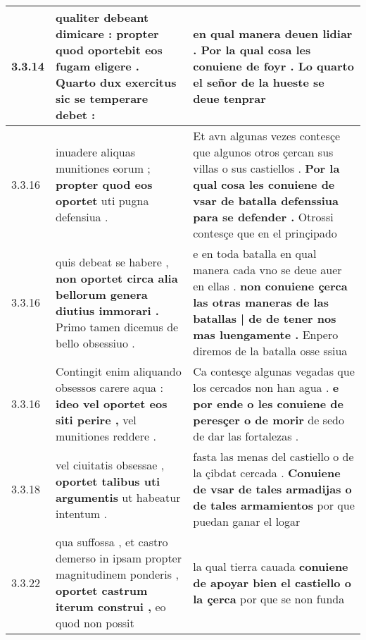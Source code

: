 \begin{tabular}{|p{1cm}|p{6.5cm}|p{6.5cm}|}
3.3.14 & qualiter debeant dimicare : \textbf{ propter quod oportebit eos fugam eligere . } Quarto dux exercitus sic se temperare debet : & en qual manera deuen lidiar . \textbf{ Por la qual cosa les conuiene de foyr . } Lo quarto el señor de la hueste se deue tenprar \\\hline
3.3.16 & inuadere aliquas munitiones eorum ; \textbf{ propter quod eos oportet } uti pugna defensiua . & Et avn algunas vezes contesçe que algunos otros çercan sus villas o sus castiellos . \textbf{ Por la qual cosa les conuiene de vsar de batalla defenssiua para se defender . } Otrossi contesçe que en el prinçipado \\\hline
3.3.16 & quis debeat se habere , \textbf{ non oportet circa alia bellorum genera diutius immorari . } Primo tamen dicemus de bello obsessiuo . & e en toda batalla en qual manera cada vno se deue auer en ellas . \textbf{ non conuiene çerca las otras maneras de las batallas | de de tener nos mas luengamente . } Enpero diremos de la batalla osse ssiua \\\hline
3.3.16 & Contingit enim aliquando obsessos carere aqua : \textbf{ ideo vel oportet eos siti perire , } vel munitiones reddere . & Ca contesçe algunas vegadas que los cercados non han agua . \textbf{ e por ende o les conuiene de peresçer o de morir } de sedo de dar las fortalezas . \\\hline
3.3.18 & vel ciuitatis obsessae , \textbf{ oportet talibus uti argumentis } ut habeatur intentum . & fasta las menas del castiello o de la çibdat cercada . \textbf{ Conuiene de vsar de tales armadijas o de tales armamientos } por que puedan ganar el logar \\\hline
3.3.22 & qua suffossa , et castro demerso in ipsam propter magnitudinem ponderis , \textbf{ oportet castrum iterum construi , } eo quod non possit & la qual tierra cauada \textbf{ conuiene de apoyar bien el castiello o la çerca } por que se non funda \\\hline

\end{tabular}
